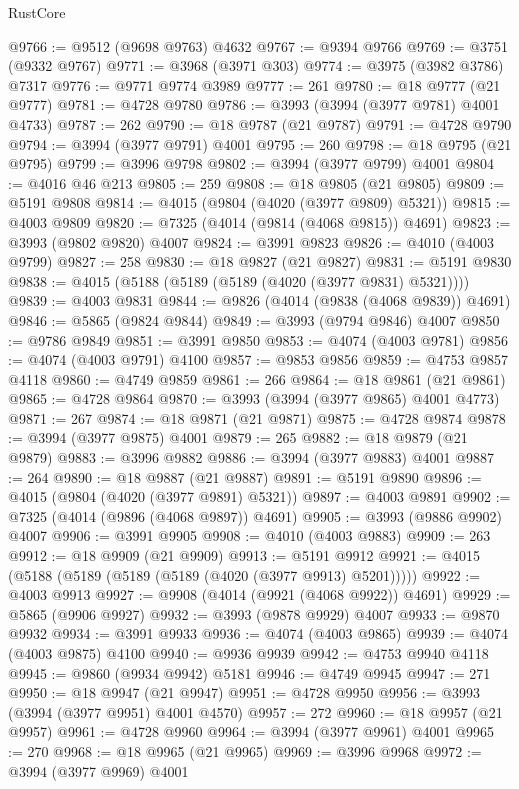 \begin{lexlean}{RustCore}
\begin{coremodule}
@9766 := @9512 (@9698 @9763) @4632
@9767 := @9394 @9766
@9769 := @3751 (@9332 @9767)
@9771 := @3968 (@3971 @303)
@9774 := @3975 (@3982 @3786) @7317
@9776 := @9771 @9774 @3989
@9777 := 261
@9780 := @18 @9777 (@21 @9777)
@9781 := @4728 @9780
@9786 := @3993 (@3994 (@3977 @9781) @4001 @4733)
@9787 := 262
@9790 := @18 @9787 (@21 @9787)
@9791 := @4728 @9790
@9794 := @3994 (@3977 @9791) @4001
@9795 := 260
@9798 := @18 @9795 (@21 @9795)
@9799 := @3996 @9798
@9802 := @3994 (@3977 @9799) @4001
@9804 := @4016 @46 @213
@9805 := 259
@9808 := @18 @9805 (@21 @9805)
@9809 := @5191 @9808
@9814 := @4015 (@9804 (@4020 (@3977 @9809) @5321))
@9815 := @4003 @9809
@9820 := @7325 (@4014 (@9814 (@4068 @9815)) @4691)
@9823 := @3993 (@9802 @9820) @4007
@9824 := @3991 @9823
@9826 := @4010 (@4003 @9799)
@9827 := 258
@9830 := @18 @9827 (@21 @9827)
@9831 := @5191 @9830
@9838 := @4015 (@5188 (@5189 (@5189 (@4020 (@3977 @9831) @5321))))
@9839 := @4003 @9831
@9844 := @9826 (@4014 (@9838 (@4068 @9839)) @4691)
@9846 := @5865 (@9824 @9844)
@9849 := @3993 (@9794 @9846) @4007
@9850 := @9786 @9849
@9851 := @3991 @9850
@9853 := @4074 (@4003 @9781)
@9856 := @4074 (@4003 @9791) @4100
@9857 := @9853 @9856
@9859 := @4753 @9857 @4118
@9860 := @4749 @9859
@9861 := 266
@9864 := @18 @9861 (@21 @9861)
@9865 := @4728 @9864
@9870 := @3993 (@3994 (@3977 @9865) @4001 @4773)
@9871 := 267
@9874 := @18 @9871 (@21 @9871)
@9875 := @4728 @9874
@9878 := @3994 (@3977 @9875) @4001
@9879 := 265
@9882 := @18 @9879 (@21 @9879)
@9883 := @3996 @9882
@9886 := @3994 (@3977 @9883) @4001
@9887 := 264
@9890 := @18 @9887 (@21 @9887)
@9891 := @5191 @9890
@9896 := @4015 (@9804 (@4020 (@3977 @9891) @5321))
@9897 := @4003 @9891
@9902 := @7325 (@4014 (@9896 (@4068 @9897)) @4691)
@9905 := @3993 (@9886 @9902) @4007
@9906 := @3991 @9905
@9908 := @4010 (@4003 @9883)
@9909 := 263
@9912 := @18 @9909 (@21 @9909)
@9913 := @5191 @9912
@9921 := @4015 (@5188 (@5189 (@5189 (@5189 (@4020 (@3977 @9913) @5201)))))
@9922 := @4003 @9913
@9927 := @9908 (@4014 (@9921 (@4068 @9922)) @4691)
@9929 := @5865 (@9906 @9927)
@9932 := @3993 (@9878 @9929) @4007
@9933 := @9870 @9932
@9934 := @3991 @9933
@9936 := @4074 (@4003 @9865)
@9939 := @4074 (@4003 @9875) @4100
@9940 := @9936 @9939
@9942 := @4753 @9940 @4118
@9945 := @9860 (@9934 @9942) @5181
@9946 := @4749 @9945
@9947 := 271
@9950 := @18 @9947 (@21 @9947)
@9951 := @4728 @9950
@9956 := @3993 (@3994 (@3977 @9951) @4001 @4570)
@9957 := 272
@9960 := @18 @9957 (@21 @9957)
@9961 := @4728 @9960
@9964 := @3994 (@3977 @9961) @4001
@9965 := 270
@9968 := @18 @9965 (@21 @9965)
@9969 := @3996 @9968
@9972 := @3994 (@3977 @9969) @4001

\end{coremodule}
\end{lexlean}
